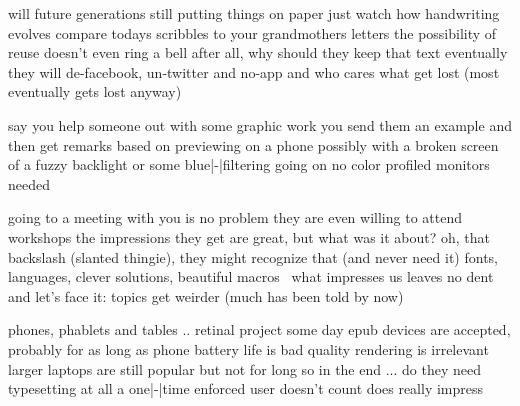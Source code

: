\startsection[title={writing}]
    \startitemize
    \startitem will future generations still putting things on paper \stopitem
    \startitem just watch how handwriting evolves \stopitem
    \startitem compare todays scribbles to your grandmothers letters \stopitem
    \startitem the possibility of reuse doesn't even ring a bell \stopitem
    \startitem after all, why should they keep that text \stopitem
    \startitem eventually they will de-facebook, un-twitter and no-app \stopitem
    \startitem and who cares what get lost (most eventually gets lost anyway) \stopitem
    \stopitemize
\stopsection

\startsection[title={quality}]
    \startitemize
    \startitem say you help someone out with some graphic work \stopitem
    \startitem you send them an example \stopitem
    \startitem and then get remarks based on previewing on a phone \stopitem
    \startitem possibly with a broken screen \stopitem
    \startitem of a fuzzy backlight \stopitem
    \startitem or some blue|-|filtering going on \stopitem
    \startitem no color profiled monitors needed \stopitem
    \stopitemize
\stopsection

\startsection[title={low impact}]
    \startitemize
    \startitem going to a meeting with you is no problem \stopitem
    \startitem they are even willing to attend workshops \stopitem
    \startitem the impressions they get are great, but what was it about? \stopitem
    \startitem oh, that backslash (slanted thingie), they might recognize that (and never need it) \stopitem
    \startitem fonts, languages, clever solutions, beautiful macros \unknown\ what impresses us
               leaves no dent \stopitem
    \startitem and let's face it: topics get weirder (much has been told by now) \stopitem
    \stopitemize
\stopsection

\startsection[title={devices}]
    \startitemize
    \startitem phones, phablets and tables .. retinal project some day \stopitem
    \startitem epub devices are accepted, probably for as long as phone battery life is bad \stopitem
    \startitem quality rendering is irrelevant \stopitem
    \startitem larger laptops are still popular but not for long \stopitem
    \startitem so in the end ... do they need typesetting at all \stopitem
    \startitem a one|-|time enforced user doesn't count \stopitem
    \startitem does  really impress \stopitem
    \stopitemize
\stopsection


